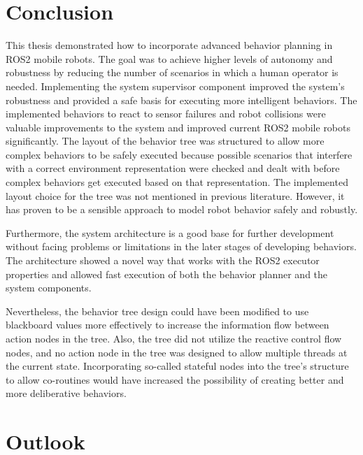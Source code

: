 \chapter{Conclusion}
\label{cha:diskussion}

This thesis demonstrated how to incorporate advanced behavior planning in ROS2 mobile robots. The goal was to achieve higher levels of autonomy and robustness by reducing the number of scenarios in which a human operator is needed. Implementing the system supervisor component improved the system's robustness and provided a safe basis for executing more intelligent behaviors. The implemented behaviors to react to sensor failures and robot collisions were valuable improvements to the system and improved current ROS2 mobile robots significantly. The layout of the behavior tree was structured to allow more complex behaviors to be safely executed because possible scenarios that interfere with a correct environment representation were checked and dealt with before complex behaviors get executed based on that representation. 
The implemented layout choice for the tree was not mentioned in previous literature. However, it has proven to be a sensible approach to model robot behavior safely and robustly. 

Furthermore, the system architecture is a good base for further development without facing problems or limitations in the later stages of developing behaviors. The architecture showed a novel way that works with the ROS2 executor properties and allowed fast execution of both the behavior planner and the system components. 

Nevertheless, the behavior tree design could have been modified to use blackboard values more effectively to increase the information flow between action nodes in the tree. Also, the tree did not utilize the reactive control flow nodes, and no action node in the tree was designed to allow multiple threads at the current state. Incorporating so-called stateful nodes into the tree's structure to allow co-routines would have increased the possibility of creating better and more deliberative behaviors. 

\chapter{Outlook}
\label{cha:outlook}

